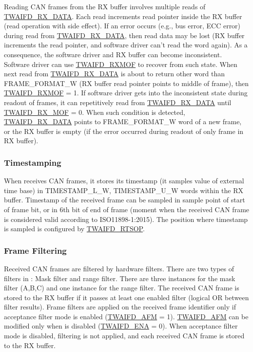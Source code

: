 \documentclass[main\_\_EN.tex]{subfiles}
\begin{document}
Reading CAN frames from the RX buffer involves multiple reads of \hyperref[regdesc:TWAIFDRXDATAREG]{TWAIFD\_RX\_DATA}. Each read increments read pointer inside the RX buffer (read operation with side effect). If an error occurs (e.g., bus error, ECC error) during read from \hyperref[regdesc:TWAIFDRXDATAREG]{TWAIFD\_RX\_DATA}, then read data may be lost (RX buffer increments the read pointer, and software driver can't read the word again). As a consequence, the software driver and RX buffer can become inconsistent. Software driver can use \hyperref[fielddesc:TWAIFDRXMOF]{TWAIFD\_RXMOF} to recover from such state. When next read from \hyperref[regdesc:TWAIFDRXDATAREG]{TWAIFD\_RX\_DATA} is about to return other word than FRAME\_FORMAT\_W (RX buffer read pointer points to middle of frame), then \hyperref[fielddesc:TWAIFDRXMOF]{TWAIFD\_RXMOF} = 1. If software driver gets into the inconsistent state during readout of frames, it can repetitively read from \hyperref[regdesc:TWAIFDRXDATAREG]{TWAIFD\_RX\_DATA} until \hyperref[fielddesc:TWAIFDRXMOF]{TWAIFD\_RX\_MOF} = 0. When such condition is detected, \hyperref[regdesc:TWAIFDRXDATAREG]{TWAIFD\_RX\_DATA} points to FRAME\_FORMAT\_W word of a new frame, or the RX buffer is empty (if the error occurred during readout of only frame in RX buffer).

\subsubsection{Timestamping}

When \modulename{} receives CAN frames, it stores its timestamp (it samples value of external time base) in TIMESTAMP\_L\_W, TIMESTAMP\_U\_W words within the RX buffer. Timestamp of the received frame can be sampled in sample point of start of frame bit, or in 6th bit of end of frame (moment when the received CAN frame is considered valid according to ISO11898-1:2015). The position where timestamp is sampled is configured by \hyperref[fielddesc:TWAIFDRTSOP]{TWAIFD\_RTSOP}.

\subsubsection{Frame Filtering}

Received CAN frames are filtered by hardware filters. There are two types of filters in \modulename{}: Mask filter and range filter. There are three instances for the mask filter (A,B,C) and one instance for the range filter. The received CAN frame is stored to the RX buffer if it passes at least one
 enabled filter (logical OR between filter results). Frame filters are applied on the received frame identifier only if acceptance filter mode is enabled (\hyperref[fielddesc:TWAIFDAFM]{TWAIFD\_AFM} = 1). \hyperref[fielddesc:TWAIFDAFM]{TWAIFD\_AFM} can be modified only when \modulename{} is disabled (\hyperref[fielddesc:TWAIFDENA]{TWAIFD\_ENA} = 0). When acceptance filter mode is disabled, filtering is not applied, and each received CAN frame is stored to the RX buffer.
\end{document}
